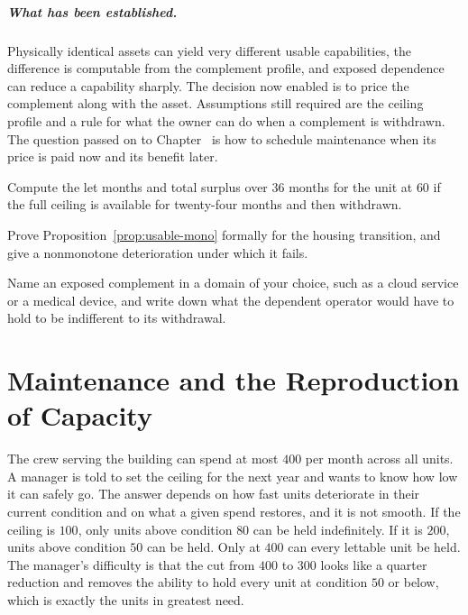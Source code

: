 \paragraph{What has been established.} Physically identical assets can yield very different usable capabilities, the difference is computable from the complement profile, and exposed dependence can reduce a capability sharply. The decision now enabled is to price the complement along with the asset. Assumptions still required are the ceiling profile and a rule for what the owner can do when a complement is withdrawn. The question passed on to Chapter~ is how to schedule maintenance when its price is paid now and its benefit later.

\begin{exercise}
Compute the let months and total surplus over $36$ months for the unit at $60$ if the full ceiling is available for twenty-four months and then withdrawn.
\end{exercise}
\begin{exercise}
Prove Proposition~\ref{prop:usable-mono} formally for the housing transition, and give a nonmonotone deterioration under which it fails.
\end{exercise}
\begin{exercise}
Name an exposed complement in a domain of your choice, such as a cloud service or a medical device, and write down what the dependent operator would have to hold to be indifferent to its withdrawal.
\end{exercise}

\chapter{Maintenance and the Reproduction of Capacity}\label{ch:8}

The crew serving the building can spend at most $400$ per month across all units. A manager is told to set the ceiling for the next year and wants to know how low it can safely go. The answer depends on how fast units deteriorate in their current condition and on what a given spend restores, and it is not smooth. If the ceiling is $100$, only units above condition $80$ can be held indefinitely. If it is $200$, units above condition $50$ can be held. Only at $400$ can every lettable unit be held. The manager's difficulty is that the cut from $400$ to $300$ looks like a quarter reduction and removes the ability to hold every unit at condition $50$ or below, which is exactly the units in greatest need.

